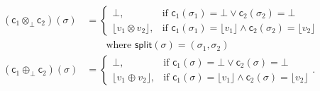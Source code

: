 \documentclass[orivec,final]{llncs-href}
\newcommand{\tracesplit}{\mathsf{split}}
\newcommand{\lift}[1]{\lfloor #1 \rfloor}
\newcommand{\trace}{\sigma}
\newcommand{\contract}{\mathsf{c}}
\begin{document}
\begin{align*}
  (\contract_1 \otimes_\bot \contract_2)(\trace) &= \left\{ \begin{array}{ll}
      \bot, &\mbox{if } \contract_1(\trace_1) = \bot \lor \contract_2(\trace_2) =
      \bot\\
      \lift{v_1 \otimes v_2}, &\mbox{if } \contract_1(\trace_1) = \lift{v_1} \land
      \contract_2(\trace_2) = \lift{v_2}
    \end{array}\right.\\
  &\qquad \mbox{where } \tracesplit(\trace) = (\trace_1,\trace_2)\\
  (\contract_1 \oplus_\bot \contract_2)(\trace) &= \left\{ \begin{array}{ll}
      \bot, &\mbox{if } \contract_1(\trace) = \bot \lor \contract_2(\trace) =
      \bot\\
      \lift{v_1 \oplus v_2}, &\mbox{if } \contract_1(\trace) = \lift{v_1} \land
      \contract_2(\trace) = \lift{v_2}
    \end{array}\right. .
\end{align*}
\end{document}
